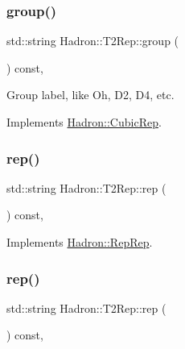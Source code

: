 \subsubsection{\texorpdfstring{group()}{group()}\hspace{0.1cm}{\footnotesize\ttfamily [2/2]}}
{\footnotesize\ttfamily std\+::string Hadron\+::\+T2\+Rep\+::group (\begin{DoxyParamCaption}{ }\end{DoxyParamCaption}) const\hspace{0.3cm}{\ttfamily [inline]}, {\ttfamily [virtual]}}

Group label, like Oh, D2, D4, etc. 

Implements \mbox{\hyperlink{structHadron_1_1CubicRep_a0748f11ec87f387062c8e8981339a29c}{Hadron\+::\+Cubic\+Rep}}.

\mbox{\label{structHadron_1_1T2Rep_aa8debf402fc347d71fe8ba6745578c0d}} 
\subsubsection{\texorpdfstring{rep()}{rep()}\hspace{0.1cm}{\footnotesize\ttfamily [1/3]}}
{\footnotesize\ttfamily std\+::string Hadron\+::\+T2\+Rep\+::rep (\begin{DoxyParamCaption}{ }\end{DoxyParamCaption}) const\hspace{0.3cm}{\ttfamily [inline]}, {\ttfamily [virtual]}}



Implements \mbox{\hyperlink{structHadron_1_1RepRep_ab3213025f6de249f7095892109575fde}{Hadron\+::\+Rep\+Rep}}.

\mbox{\label{structHadron_1_1T2Rep_aa8debf402fc347d71fe8ba6745578c0d}} 
\subsubsection{\texorpdfstring{rep()}{rep()}\hspace{0.1cm}{\footnotesize\ttfamily [2/3]}}
{\footnotesize\ttfamily std\+::string Hadron\+::\+T2\+Rep\+::rep (\begin{DoxyParamCaption}{ }\end{DoxyParamCaption}) const\hspace{0.3cm}{\ttfamily [inline]}, {\ttfamily [virtual]}}



